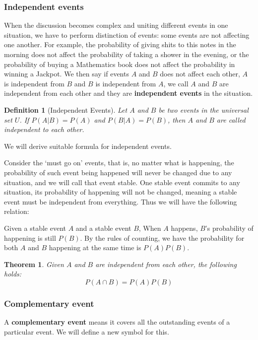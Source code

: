 \documentclass[12pt]{article}
\newtheorem{definition}{Definition}[section]
\newtheorem*{theorem}{Theorem}
\begin{document}
    \subsubsection*{Independent events}

    When the discussion becomes complex and uniting different events in one situation, we have to perform distinction of events: some events are not affecting one another. For example, the probability of giving shits to this notes in the morning does not affect the probability of taking a shower in the evening, or the probability of buying a Mathematics book does not affect the probability in winning a Jackpot. We then say if events $A$ and $B$ does not affect each other, $A$ is independent from $B$ and $B$ is independent from $A$, we call $A$ and $B$ are independent from each other and they are \textbf{independent events} in the situation.

    \begin{definition}[Independent Events]
        Let $A$ and $B$ be two events in the universal set $U$. If $P(A|B)=P(A)$ and $P(B|A)=P(B)$, then $A$ and $B$ are called independent to each other.
    \end{definition}

    We will derive suitable formula for independent events.

    Consider the `must go on' events, that is, no matter what is happening, the probability of such event being happened will never be changed due to any situation, and we will call that event stable. One stable event commits to any situation, its probability of happening will not be changed, meaning a stable event must be independent from everything. Thus we will have the following relation:

    Given a stable event $A$ and a stable event $B$, When $A$ happens, $B$'s probability of happening is still $P(B)$. By the rules of counting, we have the probability for both $A$ and $B$ happening at the same time is $P(A)P(B)$.

    \begin{theorem}
        Given $A$ and $B$ are independent from each other, the following holds:\[P(A\cap B)=P(A)P(B)\]
    \end{theorem}

    \subsubsection*{Complementary event}

    A \textbf{complementary event} means it covers all the outstanding events of a particular event. We will define a new symbol for this.
\end{document}
